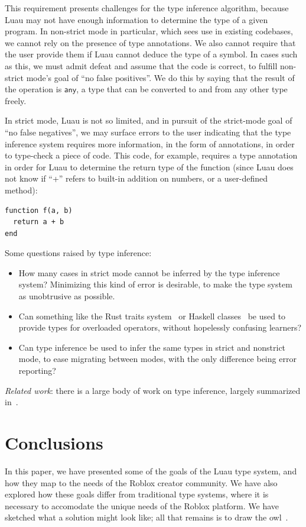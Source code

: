 \documentclass[acmsmall]{acmart}
\begin{document}
This requirement presents challenges for the type inference algorithm, because Luau may not have
enough information to determine the type of a given program. In non-strict mode in particular,
which sees use in existing codebases, we cannot rely on the presence of type annotations. We also
cannot require that the user provide them if Luau cannot deduce the type of a symbol. In cases
such as this, we must admit defeat and assume that the code is correct, to fulfill non-strict
mode's goal of ``no false positives''. We do this by saying that the result of the operation is
$\mathsf{any}$, a type that can be converted to and from any other type freely.

In strict mode, Luau is not so limited, and in pursuit of the strict-mode goal of ``no false
negatives'', we may surface errors to the user indicating that the type inference system requires
more information, in the form of annotations, in order to type-check a piece of code. This code,
for example, requires a type annotation in order for Luau to determine the return type of the function (since Luau does not know if ``+'' refers to built-in addition on numbers, or a user-defined method):

\lstset{language=[5.1]Lua}
\begin{lstlisting}
function f(a, b)
  return a + b
end
\end{lstlisting}

Some questions raised by type inference:
\begin{itemize}

\item How many cases in strict mode cannot be inferred by the type inference system? Minimizing
  this kind of error is desirable, to make the type system as unobtrusive as possible.
\item Can something like the Rust traits system~\cite{RustBook} or Haskell classes~\cite{TypeClasses} be used to provide types for overloaded operators, without hopelessly confusing learners?

\item Can type inference be used to infer the same types in strict and nonstrict mode, to ease migrating between modes, with the only difference being error reporting?
\end{itemize}

\emph{Related work}: there is a large body of work on type inference, largely summarized in~\cite{TAPL}.

\section{Conclusions}

In this paper, we have presented some of the goals of the Luau type
system, and how they map to the needs of the Roblox creator
community. We have also explored how these goals differ from traditional
type systems, where it is necessary to accomodate the unique needs of
the Roblox platform. We have sketched what a solution might look like;
all that remains is to draw the owl~\cite{HowToDrawAnOwl}.

 
\end{document}
